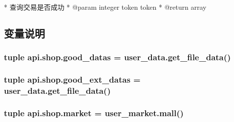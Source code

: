 \begin{DoxyVerb}* 查询交易是否成功
* @param  integer token   token
* @return array
\end{DoxyVerb}
 

\subsection{变量说明}
\hypertarget{namespaceapi_1_1shop_a9e7d31f6d45d5d76ef832a93f73e7a08}{
\subsubsection[{good\-\_\-datas}]{\setlength{\rightskip}{0pt plus 5cm}tuple api.\-shop.\-good\-\_\-datas = user\-\_\-data.\-get\-\_\-file\-\_\-data()}}\label{namespaceapi_1_1shop_a9e7d31f6d45d5d76ef832a93f73e7a08}
\hypertarget{namespaceapi_1_1shop_a86db8e627498933a3294798776ca3188}{
\subsubsection[{good\-\_\-ext\-\_\-datas}]{\setlength{\rightskip}{0pt plus 5cm}tuple api.\-shop.\-good\-\_\-ext\-\_\-datas = user\-\_\-data.\-get\-\_\-file\-\_\-data()}}\label{namespaceapi_1_1shop_a86db8e627498933a3294798776ca3188}
\hypertarget{namespaceapi_1_1shop_a4ad3ac2221dfb1c48875c21f241d77c2}{
\subsubsection[{market}]{\setlength{\rightskip}{0pt plus 5cm}tuple api.\-shop.\-market = user\-\_\-market.\-mall()}}\label{namespaceapi_1_1shop_a4ad3ac2221dfb1c48875c21f241d77c2}
